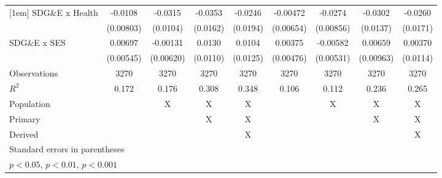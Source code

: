 {\begin{tabular}{l*{8}{c}}
[1em]
SDG\&E x Health     &     -0.0108         &     -0.0315\sym{**} &     -0.0353\sym{*}  &     -0.0246         &    -0.00472         &     -0.0274\sym{**} &     -0.0302\sym{*}  &     -0.0260         \\
                    &   (0.00803)         &    (0.0104)         &    (0.0162)         &    (0.0194)         &   (0.00654)         &   (0.00856)         &    (0.0137)         &    (0.0171)         \\
[1em]
SDG\&E x SES        &     0.00697         &    -0.00131         &      0.0130         &      0.0104         &     0.00375         &    -0.00582         &     0.00659         &     0.00370         \\
                    &   (0.00545)         &   (0.00620)         &    (0.0110)         &    (0.0125)         &   (0.00476)         &   (0.00531)         &   (0.00963)         &    (0.0114)         \\
\hline
Observations        &        3270         &        3270         &        3270         &        3270         &        3270         &        3270         &        3270         &        3270         \\
\(R^{2}\)           &       0.172         &       0.176         &       0.308         &       0.348         &       0.106         &       0.112         &       0.236         &       0.265         \\
Population          &                     &           X         &           X         &           X         &                     &           X         &           X         &           X         \\
Primary             &                     &                     &           X         &           X         &                     &                     &           X         &           X         \\
Derived             &                     &                     &                     &           X         &                     &                     &                     &           X         \\
\hline\hline
\multicolumn{9}{l}{\footnotesize Standard errors in parentheses}\\
\multicolumn{9}{l}{\footnotesize \sym{*} \(p<0.05\), \sym{**} \(p<0.01\), \sym{***} \(p<0.001\)}\\
\end{tabular}
}
